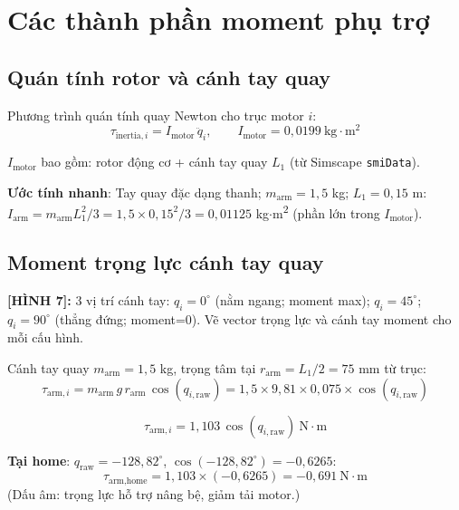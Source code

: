 \documentclass[12pt,a4paper]{article}
\newcommand{\figref}[2]{%
  \begin{mdframed}[
    linecolor=blue!50, linewidth=1pt,
    backgroundcolor=blue!3,
    innerleftmargin=6pt, innerrightmargin=6pt,
    innertopmargin=4pt, innerbottommargin=4pt
  ]
  {\small\bfseries [H\`{I}NH #1]:} {\small #2}
  \end{mdframed}
}
\begin{document}
\section{Các thành phần moment phụ trợ}

\subsection{Quán tính rotor và cánh tay quay}

Phương trình quán tính quay Newton cho trục motor $i$:
\begin{equation}
  \tau_{\text{inertia},i} = I_{\text{motor}}\,\ddot q_i,
  \qquad I_{\text{motor}} = 0{,}0199\ \text{kg}\!\cdot\!\text{m}^2
  \label{eq:tau_inertia}
\end{equation}

$I_{\text{motor}}$ bao gồm: rotor động cơ + cánh tay quay $L_1$ (từ Simscape \texttt{smiData}).

\textbf{Ước tính nhanh}: Tay quay đặc dạng thanh; $m_{\text{arm}}=1{,}5$ kg; $L_1=0{,}15$ m:
$I_{\text{arm}} = m_{\text{arm}}L_1^2/3 = 1{,}5\times0{,}15^2/3 = 0{,}01125$ kg$\cdot$m\textsuperscript{2} (phần lớn trong $I_{\text{motor}}$).

\subsection{Moment trọng lực cánh tay quay}

\figref{7}{3 vị trí cánh tay: $q_i=0^{\circ}$ (nằm ngang; moment max); $q_i=45^{\circ}$; $q_i=90^{\circ}$
(thẳng đứng; moment=0). Vẽ vector trọng lực và cánh tay moment cho mỗi cấu hình.}

Cánh tay quay $m_{\text{arm}}=1{,}5$ kg, trọng tâm tại $r_{\text{arm}}=L_1/2 = 75$ mm từ trục:
\begin{equation}
  \tau_{\text{arm},i} = m_{\text{arm}}\,g\,r_{\text{arm}}\,\cos(q_{i,\text{raw}})
  = 1{,}5 \times 9{,}81 \times 0{,}075 \times \cos(q_{i,\text{raw}})
  \label{eq:tau_grav}
\end{equation}

\begin{equation}
  \tau_{\text{arm},i} = 1{,}103\,\cos(q_{i,\text{raw}})\ \text{N}\cdot\text{m}
\end{equation}

\textbf{Tại home}: $q_{\text{raw}} = -128{,}82^{\circ}$, $\cos(-128{,}82^{\circ}) = -0{,}6265$:
\[
  \tau_{\text{arm,home}} = 1{,}103 \times (-0{,}6265) = -0{,}691\ \text{N}\cdot\text{m}
\]
(Dấu âm: trọng lực hỗ trợ nâng bệ, giảm tải motor.)
\end{document}
